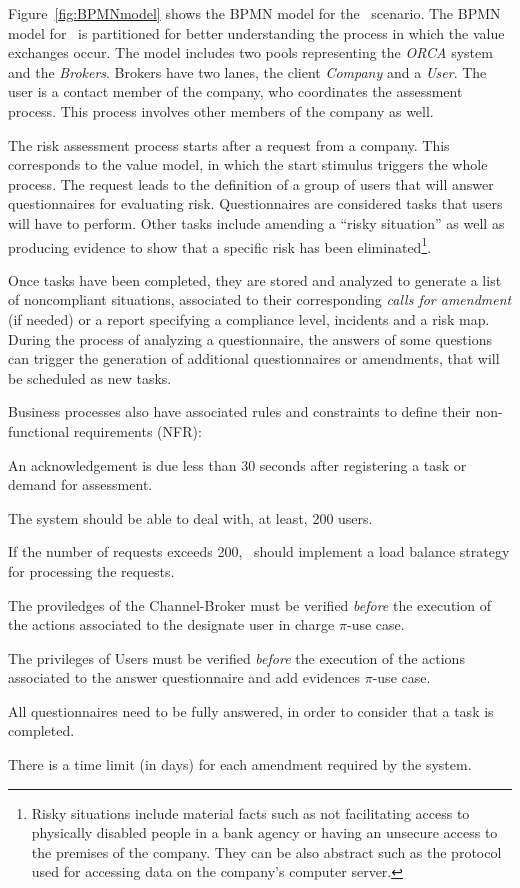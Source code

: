 Figure~\ref{fig:BPMNmodel} shows the BPMN model
for the \FlyingPig\ scenario. The BPMN model for \FlyingPig\ is partitioned for better understanding the process in which the value exchanges occur.
The model includes two pools representing the \textsl{ORCA} system and the \textsl{Brokers}. 
Brokers have two lanes, the client \textsl{Company} and a \textsl{User}. 
The user is a contact member of the company, who  coordinates the assessment process. 
This process  involves other members of the company as well.

The risk assessment process starts after a request from a company.
This corresponds to the value model, in which the start stimulus triggers the whole process.
The request leads to the definition of a group of users that will answer questionnaires for evaluating risk.
Questionnaires are considered tasks that users will have to perform. 
Other tasks include amending a ``risky situation'' as well as producing evidence to show that a specific risk has been eliminated\footnote{Risky situations include  material facts such as not facilitating access to physically disabled people in a bank agency or having an unsecure access to the premises of the company. They can be also abstract  such as the protocol used for accessing data on the company's computer server.}.

Once tasks have been completed, they are stored and analyzed to generate a list of noncompliant situations, associated to their corresponding \textit{calls for amendment} (if needed) or a report specifying a compliance level, incidents and a risk map.
During the process of analyzing a questionnaire, the answers of some questions can trigger the generation of additional questionnaires or amendments, that will be scheduled as new tasks.  

Business processes also have associated rules and constraints to define their non-functional requirements (NFR):
\begin{numtrivlist}
\item An acknowledgement is due less than 30 seconds after registering a task or demand for assessment. 
\item The system should be able to deal with, at least, 200 users. 
\item If the number of requests exceeds 200, \FlyingPig\ should implement a load balance strategy for processing the requests. 
\item The proviledges of the Channel-Broker must be verified \textit{before} the execution of the actions associated to the \textsf{designate user in charge} $\pi$-use case.
\item The privileges of Users must be verified \textit{before} the execution of the actions associated to the \textsf{answer questionnaire and add evidences} $\pi$-use case.
\item All questionnaires need to be fully answered, in order to consider that a task is completed.
\item There is a time limit (in days) for each amendment required by the system.
\end{numtrivlist}



